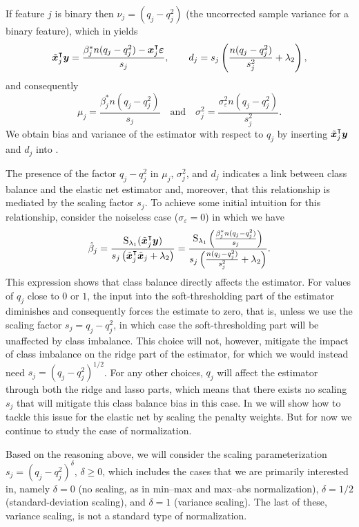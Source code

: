 If feature $j$ is binary then \(\nu_j = (q_j - q_j^2)\) (the uncorrected sample variance
for a binary feature), which in  yields
\begin{equation*}
  \tilde{\bm{x}}_j^\intercal \bm{y} = \frac{\beta_j^* n(q_j - q_j^2) - \bm{x}_j^\intercal \bm{\varepsilon}}{s_j}, \qquad
  d_j                          = s_j \left(\frac{n(q_j - q_j^2)}{s_j^2} + \lambda_2\right),
\end{equation*}
and consequently
\[
  \mu_j = \frac{\beta^*_j n(q_j - q_j^2)}{s_j}\quad \text{and} \quad \sigma_j^2 = \frac{\sigma_\varepsilon^2n(q_j- q_j^2)}{s^2_j}.
\]
%
We obtain bias and variance of the estimator with respect to \(q_j\) by inserting
\(\tilde{\bm{x}}_j^\intercal \bm{y}\) and \(d_j\) into .

The presence of the factor \(q_j - q_j^2\) in \(\mu_j\), \(\sigma_j^2\), and \(d_j\)
indicates a link between class balance and the elastic net estimator and, moreover, that
this relationship is mediated by the scaling factor \(s_j\). To achieve some initial
intuition for this relationship, consider the noiseless case (\(\sigma_\varepsilon = 0\))
in which we have
\begin{equation}
  \label{eq:noiseless-estimator}
  \hat{\beta}_j = \frac{\operatorname{S}_{\lambda_1}(\tilde{\bm{x}}_j^\intercal \bm{y})}{s_j\left(\tilde{\bm{x}}_j^\intercal \tilde{\bm{x}}_j + \lambda_2\right)}
  =
  \frac{\operatorname{S}_{\lambda_1}\left(\frac{\beta_j^* n (q_j - q_j^2)}{s_j}\right)}{s_j\left(\frac{n(q_j - q_j^2)}{s_j^2} + \lambda_2\right)}.
\end{equation}
%
This expression shows that class balance directly affects the estimator. For values of
\(q_j\) close to \(0\) or \(1\), the input into the soft-thresholding part of the estimator
diminishes and consequently forces the estimate to zero, that is, unless we use the scaling
factor \(s_j = q_j - q_j^2\), in which case the soft-thresholding part will be unaffected
by class imbalance. This choice will not, however, mitigate the impact of class imbalance
on the ridge part of the estimator, for which we would instead need \(s_j = (q_j -
q_j^2)^{1/2}\). For any other choices, \(q_j\) will affect the estimator through both the
ridge and lasso parts, which means that there exists no scaling \(s_j\) that will mitigate
this class balance bias in this case. In  we will show how to
tackle this issue for the elastic net by scaling the penalty weights. But for now we
continue to study the case of normalization.

Based on the reasoning above, we will consider the scaling parameterization \(s_j =
(q_j-q_j^2)^\delta\), \(\delta \geq 0\), which includes the cases that we are primarily
interested in, namely \(\delta = 0\) (no scaling, as in min--max and max--abs
normalization), \(\delta = 1/2\) (standard-deviation scaling), and \(\delta = 1\) (variance
scaling). The last of these, variance scaling, is not a standard type of normalization.

